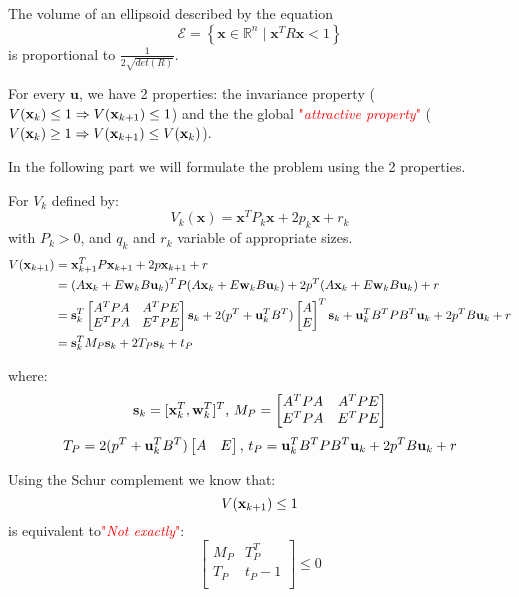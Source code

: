 \documentclass{article}
\theoremstyle{named}
\newcommand{\vect}[1]{\ensuremath{ \mathbf{#1}}}
\newcommand\comment[1]{\textcolor{red}{"\textit{#1}"}}
\begin{document}
\newcommand{\ellipse}{\mathcal{E}}
The volume of an ellipsoid described by the equation 
$$
\mathcal{E} = \left\{ \vect{x} \in \mathbb{R}^n \mid \vect{x}^T R \vect{x} < 1 \right\}
$$
is proportional to $\frac{1}{2 \sqrt{det( R )}}$.

For every $\vect{u}$, we have 2 properties: the invariance property ($V(\xk) \leq 1 \Rightarrow V(\xkn) \leq 1$) and the the global \comment{attractive property} ($V(\xk) \geq 1 \Rightarrow V(\xkn) \leq V(\xk)$).

In the following part we will formulate the problem using the 2 properties.

For $V_k$ defined by:
\newcommand{\x}{\vect{x}}
$$V_k(\x) = \x^T P_k \x + 2 p_k \x + r_k$$
with $P_k>0$, and $q_k$ and $r_k$ variable of appropriate sizes.
\begin{align*}
V(\xkn) &= \xkn^T P \xkn + 2 p \xkn + r\\
&= (A \xk + E \wk B \uk) ^T P (A \xk + E \wk B \uk)  + 2 p^T (A \xk + E \wk B \uk)  + r\\
&= \sk^T
\begin{bmatrix}
A^T P A & A^T P E\\
E^T P A & E^T P E\\
\end{bmatrix}
\sk
+
2(p^T + \uk^T B^T)
\begin{bmatrix}
A \\ E
\end{bmatrix}^T
\sk
+
\uk^T B^T  P B^T \uk +  2 p^T B \uk + r\\
&=  \sk^T M_P \sk + 2 T_P \sk + t_P
\end{align*}

where:
$$\sk = [\xk^T, \wk^T]^T
\textrm{, }
M_P = 
\begin{bmatrix}
A^T P A & A^T P E\\
E^T P A & E^T P E\\
\end{bmatrix}
$$
$$
T_P = 
2(p^T + \uk^T B^T)
\begin{bmatrix}
A & E
\end{bmatrix}
\textrm{, }
t_P=\uk^T B^T  P B^T \uk +  2 p^T B \uk + r$$

Using the Schur complement we know that:
$$V(\xkn) \leq 1$$
is equivalent to\comment{Not exactly}:
$$
\begin{bmatrix}
M_P & T_P^T\\
T_P & t_P-1\\
\end{bmatrix}
\leq
0
$$
\end{document}
